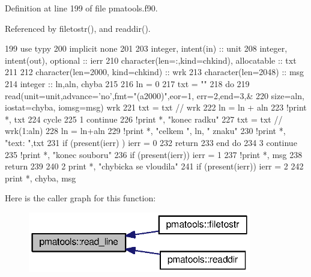 Definition at line 199 of file pmatools.\+f90.



Referenced by filetostr(), and readdir().


\begin{DoxyCode}
199         \textcolor{keywordtype}{use }typy
200         \textcolor{keywordtype}{implicit none}
201 
203         \textcolor{keywordtype}{integer}, \textcolor{keywordtype}{intent(in)} :: unit
208         \textcolor{keywordtype}{integer}, \textcolor{keywordtype}{intent(out)}, \textcolor{keywordtype}{optional} :: ierr
210         \textcolor{keywordtype}{character(len=:,kind=chkind)}, \textcolor{keywordtype}{allocatable} :: txt
211 
212         \textcolor{keywordtype}{character(len=2000, kind=chkind)} :: wrk
213         \textcolor{keywordtype}{character(len=2048)} :: msg
214         \textcolor{keywordtype}{integer} :: ln,aln, chyba
215 
216         ln = 0
217         txt = \textcolor{stringliteral}{""}
218         do
219             \textcolor{keyword}{read}(unit=unit,advance=\textcolor{stringliteral}{'no'},fmt=\textcolor{stringliteral}{"(a2000)"},eor=1, err=2,end=3,&
220             size=aln, iostat=chyba, iomsg=msg) wrk
221             txt = txt // wrk
222             ln = ln + aln
223             \textcolor{comment}{!print *, txt
}
224             cycle
225             1 continue
226             \textcolor{comment}{!print *, "konec radku"
}
227             txt = txt // wrk(1:aln)
228             ln = ln+aln
229             \textcolor{comment}{!print *, "celkem ", ln, " znaku"
}
230             \textcolor{comment}{!print *, "text: ",txt
}
231             \textcolor{keywordflow}{if} (\textcolor{keyword}{present}(ierr) ) ierr = 0
232             return
233 \textcolor{keyword}{        end }do
234         3 continue
235         \textcolor{comment}{!print *, "konec souboru"
}
236         \textcolor{keywordflow}{if} (\textcolor{keyword}{present}(ierr)) ierr = 1
237         \textcolor{comment}{!print *, msg
}
238         return
239 
240         2 print *, \textcolor{stringliteral}{"chybicka se vloudila"}
241         \textcolor{keywordflow}{if} (\textcolor{keyword}{present}(ierr)) ierr = 2
242         print *, chyba, msg
\end{DoxyCode}


Here is the caller graph for this function\+:\nopagebreak
\begin{figure}[H]
\begin{center}
\leavevmode
\includegraphics[width=276pt]{namespacepmatools_a13aaee1ff21da73c9d8f90fd37c74ee0_icgraph}
\end{center}
\end{figure}


